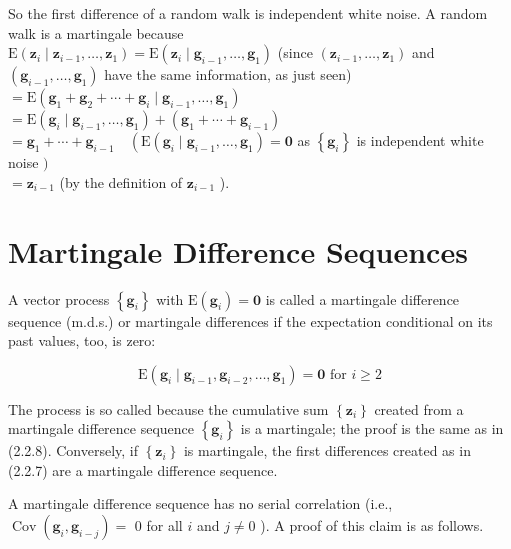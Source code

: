 \documentclass[10pt]{article}
\begin{document}
So the first difference of a random walk is independent white noise. A random walk is a martingale because\\
$\mathrm{E}\left(\mathbf{z}_{i} \mid \mathbf{z}_{i-1}, \ldots, \mathbf{z}_{1}\right)=\mathrm{E}\left(\mathbf{z}_{i} \mid \mathbf{g}_{i-1}, \ldots, \mathbf{g}_{1}\right)$ (since $\left(\mathbf{z}_{i-1}, \ldots, \mathbf{z}_{1}\right)$ and\\
$\left(\mathbf{g}_{i-1}, \ldots, \mathbf{g}_{1}\right)$ have the same information, as just seen)\\
$=\mathrm{E}\left(\mathbf{g}_{1}+\mathbf{g}_{2}+\cdots+\mathbf{g}_{i} \mid \mathbf{g}_{i-1}, \ldots, \mathbf{g}_{1}\right)$\\
$=\mathrm{E}\left(\mathbf{g}_{i} \mid \mathbf{g}_{i-1}, \ldots, \mathbf{g}_{1}\right)+\left(\mathbf{g}_{1}+\cdots+\mathbf{g}_{i-1}\right)$\\
$=\mathbf{g}_{1}+\cdots+\mathbf{g}_{i-1} \quad\left(\mathrm{E}\left(\mathbf{g}_{i} \mid \mathbf{g}_{i-1}, \ldots, \mathbf{g}_{1}\right)=\mathbf{0}\right.$ as $\left\{\mathbf{g}_{i}\right\}$ is independent white noise $)$\\
$=\mathbf{z}_{i-1}$ (by the definition of $\mathbf{z}_{i-1}$ ).

\section*{Martingale Difference Sequences}
A vector process $\left\{\mathbf{g}_{i}\right\}$ with $\mathrm{E}\left(\mathbf{g}_{i}\right)=\mathbf{0}$ is called a martingale difference sequence (m.d.s.) or martingale differences if the expectation conditional on its past values, too, is zero:


\begin{equation*}
\mathrm{E}\left(\mathbf{g}_{i} \mid \mathbf{g}_{i-1}, \mathbf{g}_{i-2}, \ldots, \mathbf{g}_{1}\right)=\mathbf{0} \text { for } i \geq 2 \tag{2.2.9}
\end{equation*}


The process is so called because the cumulative sum $\left\{\mathbf{z}_{i}\right\}$ created from a martingale difference sequence $\left\{\mathbf{g}_{i}\right\}$ is a martingale; the proof is the same as in (2.2.8). Conversely, if $\left\{\mathbf{z}_{i}\right\}$ is martingale, the first differences created as in (2.2.7) are a martingale difference sequence.

A martingale difference sequence has no serial correlation (i.e., $\operatorname{Cov}\left(\mathbf{g}_{i}, \mathbf{g}_{i-j}\right)=$ 0 for all $i$ and $j \neq 0$ ). A proof of this claim is as follows.
\end{document}
